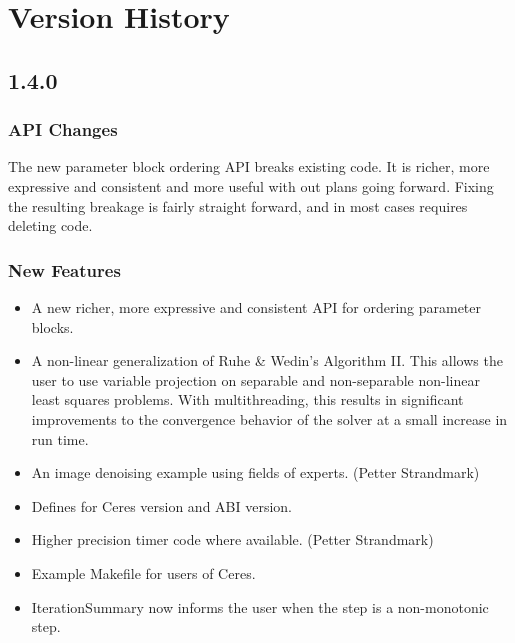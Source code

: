 
\chapter{Version History}
\section*{1.4.0}
\subsection{API Changes}
\item The new parameter block ordering API breaks existing code. It is
  richer, more expressive and consistent and more useful with out
  plans going forward. Fixing the resulting breakage is fairly
  straight forward, and in most cases requires deleting code.

\subsection{New Features}
\begin{itemize}
\item A new richer, more expressive and consistent API for ordering
  parameter blocks.
\item A non-linear generalization of Ruhe \& Wedin's Algorithm
  II. This allows the user to use variable projection on separable and
  non-separable non-linear least squares problems. With
  multithreading, this results in significant improvements to the
  convergence behavior of the solver at a small increase in run time.
\item An image denoising example using fields of experts. (Petter
  Strandmark)
\item Defines for Ceres version and ABI version.
\item Higher precision timer code where available. (Petter Strandmark)
\item Example Makefile for users of Ceres.
\item IterationSummary now informs the user when the step is a
  non-monotonic step.
\end{itemize}
